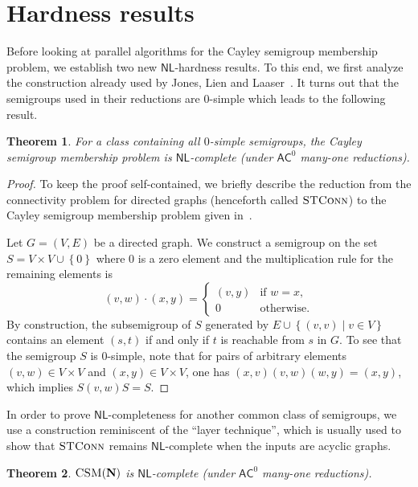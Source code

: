 \documentclass[11pt]{article}
\numberwithin{equation}{section}
\newtheorem{theorem}{Theorem}[section]
\theoremstyle{definition}
\theoremstyle{plain}
\newcommand{\union}{\mathbin{\cup}}
\newcommand{\set}[2]{\ensuremath{\left\{#1 \mid #2\right\}}}
\newcommand{\os}[1]{\ensuremath{\left\{#1\right\}}}
\newcommand{\AC}{\ensuremath{\mathsf{AC}}}
\newcommand{\NL}{\ensuremath{\mathsf{NL}}}
\newcommand{\vNil}{\mathbf{N}}
\newcommand{\CSM}{\ensuremath{\textsc{CSM}}}
\newcommand{\STCONN}{\ensuremath{\textsc{STConn}}}
\newcommand{\SCSM}{Cayley semigroup membership}
\newcommand{\SCSMP}{{\SCSM} problem}
\begin{document}
\section{Hardness results}

Before looking at parallel algorithms for the {\SCSMP}, we establish two new
$\NL$-hardness results.
%
To this end, we first analyze the construction already used by Jones, Lien and
Laaser~\cite{JonesLL76}.
%
It turns out that the semigroups used in their reductions are $0$-simple which
leads to the following result.

\begin{theorem}
  For a class containing all $0$-simple semigroups, the {\SCSMP} is
  $\NL$-complete (under $\AC^0$ many-one reductions).
  \label{thm:0-simple}
\end{theorem}

\begin{proof}
  To keep the proof self-contained, we briefly describe the reduction from
  the connectivity problem for directed graphs (henceforth called $\STCONN$) to
  the {\SCSMP} given in~\cite{JonesLL76}.

  Let $G = (V, E)$ be a directed graph.
  We construct a semigroup on the set $S = V \times V \union \os{0}$ where $0$
  is a zero element and the multiplication rule for the remaining elements is
  \begin{equation*}
    (v, w) \cdot (x, y) =
    \begin{cases}
      (v, y) & \text{if $w = x$}, \\
      0 & \text{otherwise}.
    \end{cases}
  \end{equation*}
  By construction, the subsemigroup of $S$ generated by $E \union \set{(v,
  v)}{v \in V}$ contains an element $(s, t)$ if and only if $t$ is reachable
  from $s$ in $G$.
  To see that the semigroup $S$ is $0$-simple, note that for pairs of arbitrary
  elements $(v, w) \in V \times V$ and $(x, y) \in V \times V$, one has $(x, v)
  (v, w) (w, y) = (x, y)$, which implies $S (v, w) S = S$.
\end{proof}

In order to prove $\NL$-completeness for another common class of semigroups, we
use a construction reminiscent of the ``layer technique'', which is usually
used to show that $\STCONN$ remains $\NL$-complete when the inputs are acyclic
graphs.

\begin{theorem}
  $\CSM(\vNil)$ is $\NL$-complete (under $\AC^0$ many-one reductions).
  \label{thm:nil}
\end{theorem}
\end{document}
